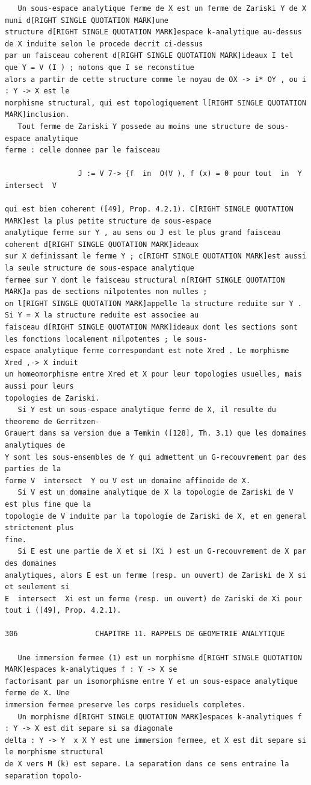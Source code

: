 \documentclass[
  11pt,
]{article}
\begin{document}
\begin{lstlisting}
   Un sous-espace analytique ferme de X est un ferme de Zariski Y de X muni d[RIGHT SINGLE QUOTATION MARK]une
structure d[RIGHT SINGLE QUOTATION MARK]espace k-analytique au-dessus de X induite selon le procede decrit ci-dessus
par un faisceau coherent d[RIGHT SINGLE QUOTATION MARK]ideaux I tel que Y = V (I ) ; notons que I se reconstitue
alors a partir de cette structure comme le noyau de OX -> i* OY , ou i : Y -> X est le
morphisme structural, qui est topologiquement l[RIGHT SINGLE QUOTATION MARK]inclusion.
   Tout ferme de Zariski Y possede au moins une structure de sous-espace analytique
ferme : celle donnee par le faisceau

                 J := V 7-> {f  in  O(V ), f (x) = 0 pour tout  in  Y  intersect  V

qui est bien coherent ([49], Prop. 4.2.1). C[RIGHT SINGLE QUOTATION MARK]est la plus petite structure de sous-espace
analytique ferme sur Y , au sens ou J est le plus grand faisceau coherent d[RIGHT SINGLE QUOTATION MARK]ideaux
sur X definissant le ferme Y ; c[RIGHT SINGLE QUOTATION MARK]est aussi la seule structure de sous-espace analytique
fermee sur Y dont le faisceau structural n[RIGHT SINGLE QUOTATION MARK]a pas de sections nilpotentes non nulles ;
on l[RIGHT SINGLE QUOTATION MARK]appelle la structure reduite sur Y . Si Y = X la structure reduite est associee au
faisceau d[RIGHT SINGLE QUOTATION MARK]ideaux dont les sections sont les fonctions localement nilpotentes ; le sous-
espace analytique ferme correspondant est note Xred . Le morphisme Xred ,-> X induit
un homeomorphisme entre Xred et X pour leur topologies usuelles, mais aussi pour leurs
topologies de Zariski.
   Si Y est un sous-espace analytique ferme de X, il resulte du theoreme de Gerritzen-
Grauert dans sa version due a Temkin ([128], Th. 3.1) que les domaines analytiques de
Y sont les sous-ensembles de Y qui admettent un G-recouvrement par des parties de la
forme V  intersect  Y ou V est un domaine affinoide de X.
   Si V est un domaine analytique de X la topologie de Zariski de V est plus fine que la
topologie de V induite par la topologie de Zariski de X, et en general strictement plus
fine.
   Si E est une partie de X et si (Xi ) est un G-recouvrement de X par des domaines
analytiques, alors E est un ferme (resp. un ouvert) de Zariski de X si et seulement si
E  intersect  Xi est un ferme (resp. un ouvert) de Zariski de Xi pour tout i ([49], Prop. 4.2.1).

306                  CHAPITRE 11. RAPPELS DE GEOMETRIE ANALYTIQUE

   Une immersion fermee (1) est un morphisme d[RIGHT SINGLE QUOTATION MARK]espaces k-analytiques f : Y -> X se
factorisant par un isomorphisme entre Y et un sous-espace analytique ferme de X. Une
immersion fermee preserve les corps residuels completes.
   Un morphisme d[RIGHT SINGLE QUOTATION MARK]espaces k-analytiques f : Y -> X est dit separe si sa diagonale
delta : Y -> Y  x X Y est une immersion fermee, et X est dit separe si le morphisme structural
de X vers M (k) est separe. La separation dans ce sens entraine la separation topolo-
\end{lstlisting}
\end{document}
